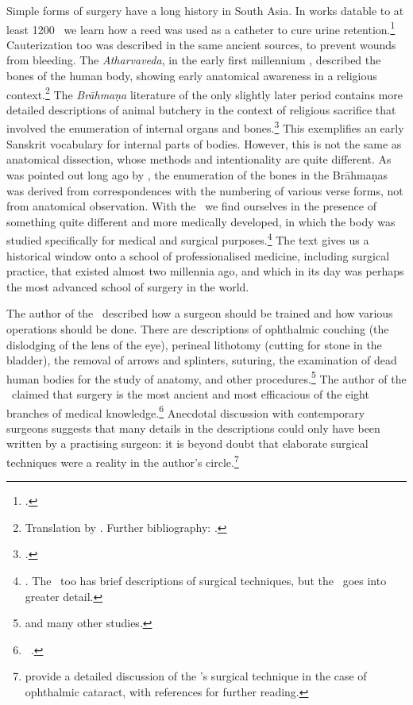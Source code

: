 Simple forms of surgery have a long history in South Asia. In works datable to at
least 1200 \BC\ we learn how a reed was used as a catheter to cure urine
retention.\footcite[70--71]{zysk-1985} Cauterization too was described in the same
ancient sources, to prevent wounds from bleeding. The \emph{Atharvaveda}, in the
early first millennium \BC, described the bones of the human body, showing early
anatomical awareness in a religious context.\footnote{Translation by \citet[\S43,
\S100]{hoer-1907}. Further bibliography: \cite[IIB, 819]{meul-hist}.} The
\emph{Brāhmaṇa} literature of the only slightly later period contains more detailed
descriptions of animal butchery in the context of religious sacrifice that
involved the enumeration of internal organs and
bones.\footcite{mala-1996,saha-2015}   This exemplifies an early Sanskrit
vocabulary for internal parts of bodies.  However, this is not the same as
anatomical dissection, whose methods and intentionality are quite different. As
was pointed out long ago by \citet{keit-1908}, the enumeration of the bones in the
Brāhmaṇas was derived from correspondences with the numbering of various verse
forms, not from anatomical observation.  With the \SS\ we find ourselves in the
presence of something quite different and more medically developed, in which the
body was studied specifically for medical and surgical
purposes.\footnote{\cite{zysk-1986}. The \CS\ too has brief descriptions of
surgical techniques, but the \SS\ goes into greater detail.} The text gives us a
historical window onto a school of professionalised medicine, including surgical
practice, that existed almost two millennia ago, and which in its day was perhaps
the most advanced school of surgery in the world.

The author of the \SS\ described how a surgeon should be trained and how various
operations should be done.  There are descriptions of ophthalmic couching (the
dislodging of the lens of the eye), perineal lithotomy (cutting for stone in the
bladder), the removal of arrows and splinters, suturing, the examination of dead
human bodies for the study of anatomy, and other
procedures.\footnote{\cites{mukh-1913,desh-2000,nara-2011,wuja-2003,wils-1823,vali-2007}
 and
many other studies.} The author of the \SS\ claimed that surgery is the most
ancient and most efficacious of the eight branches of medical
knowledge.\footnote{\SS\ .} Anecdotal discussion with
contemporary surgeons suggests that many details in the descriptions could only
have been written by a practising surgeon: it is beyond doubt that elaborate
surgical techniques were a reality in the author's circle.\footnote{\cite{leff-2020} 
provide a detailed discussion of the \SS's surgical technique in the case of ophthalmic 
cataract, with references for further reading.}

